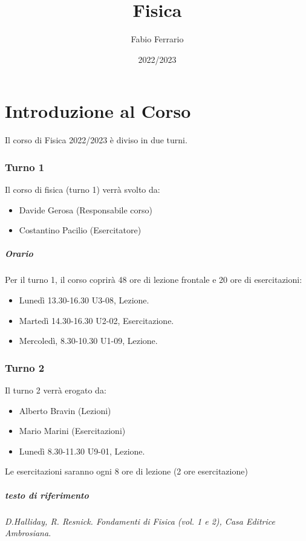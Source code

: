 \documentclass[12pt, a4paper, openany]{book}
\begin{document}
\title{Fisica}
\author{Fabio Ferrario}
\date{2022/2023}
\maketitle

\tableofcontents

\chapter{Introduzione al Corso}
Il corso di Fisica 2022/2023 è diviso in due turni.
\subsection*{Turno 1}
Il corso di fisica (turno 1) verrà svolto da:
\begin{itemize}
    \item Davide Gerosa (Responsabile corso)
    \item Costantino Pacilio (Esercitatore)
\end{itemize}
\paragraph*{Orario} Per il turno 1, il corso coprirà 48 ore di lezione frontale e 20 ore di esercitazioni:
\begin{itemize}
    \item Lunedì 13.30-16.30 U3-08, Lezione.
    \item Martedì 14.30-16.30 U2-02, Esercitazione.
    \item Mercoledì, 8.30-10.30 U1-09, Lezione.
\end{itemize}
\subsection*{Turno 2}
Il turno 2 verrà erogato da:
\begin{itemize}
    \item Alberto Bravin (Lezioni)
    \item Mario Marini (Esercitazioni)
\end{itemize}
\begin{itemize}
    \item Lunedì 8.30-11.30 U9-01, Lezione.

\end{itemize}
Le esercitazioni saranno ogni 8 ore di lezione (2 ore esercitazione)

\paragraph*{testo di riferimento} \emph{D.Halliday, R. Resnick. Fondamenti di Fisica (vol. 1 e 2), Casa Editrice Ambrosiana}.
\end{document}
